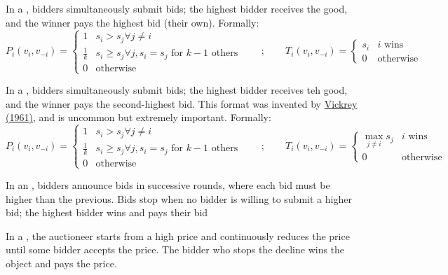 \documentclass[10pt]{article}
\begin{document}
\begin{definition}
	In a , bidders simultaneously submit bids; the highest bidder receives the good, and the winner pays the highest bid (\ie their own). Formally:
	\[
	P_i(v_i,v_{-i}) = \begin{cases} 1 & s_i > s_j \forall j \ne i \\ \frac{1}{k} & s_i \ge s_j \forall j, s_i = s_j \text{ for } k-1 \text{ others} \\ 0 & \text{otherwise} \end{cases} \qquad ; \qquad T_i(v_i,v_{-i}) = \begin{cases} s_i & i \text{ wins} \\ 0 & \text{otherwise} \end{cases}
	\]
\end{definition}

\begin{definition}
	In a , bidders simultaneously submit bids; the highest bidder receives teh good, and the winner pays the second-highest bid. This format was invented by \href{https://onlinelibrary.wiley.com/doi/abs/10.1111/j.1540-6261.1961.tb02789.x}{Vickrey (1961)}, and is uncommon but extremely important. Formally: 
	\[
	P_i(v_i,v_{-i}) = \begin{cases} 1 & s_i > s_j \forall j \ne i \\ \frac{1}{k} & s_i \ge s_j \forall j, s_i = s_j \text{ for } k-1 \text{ others} \\ 0 & \text{otherwise} \end{cases} \qquad ; \qquad T_i(v_i,v_{-i}) = \begin{cases} \max_{j\ne i} s_j & i \text{ wins} \\ 0 & \text{otherwise} \end{cases}
	\]
\end{definition}

\begin{definition}
	In an , bidders announce bids in successive rounds, where each bid must be higher than the previous. Bids stop when no bidder is willing to submit a higher bid; the highest bidder wins and pays their bid
\end{definition}

\begin{definition}
	In a , the auctioneer starts from a high price and continuously reduces the price until some bidder accepts the price. The bidder who stops the decline wins the object and pays the price.
\end{definition}
\end{document}
